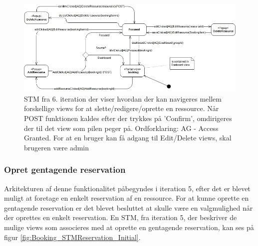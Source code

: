 \begin{figure}[H]
  \includegraphics[width=1.0\linewidth]{01_Billeder/09_Arkitektur/STM_AddResource_Final.jpg}
  \caption{STM fra 6. iteration der viser hvordan der kan navigeres mellem forskellige views for at slette/redigere/oprette en ressource. Når POST funktionen kaldes efter der trykkes på 'Confirm', omdirigeres der til det view som pilen peger på. Ordforklaring: AG - Access Granted. For at en bruger kan få adgang til Edit/Delete views, skal brugeren være admin}
  \label{fig:Booking_STMResource_Final}
\end{figure}

\subsubsection{Opret gentagende reservation}
Arkitekturen af denne funktionalitet påbegyndes i iteration 5, efter det er blevet muligt at foretage en enkelt reservation af en ressource. For at kunne oprette en gentagende reservation er det blevet besluttet at skulle være en valgmulighed når der oprettes en enkelt reservation. En STM, fra iteration 5, der beskriver de mulige views som associeres med at oprette en gentagende reservation, kan ses på figur  \ref{fig:Booking_STMReservation_Initial}.   

